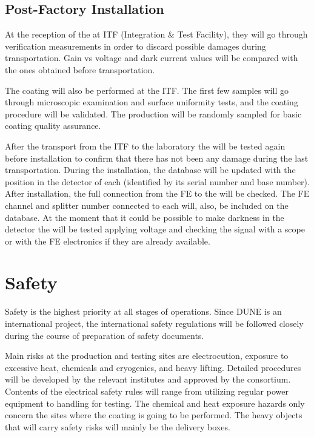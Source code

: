  \subsection{Post-Factory Installation}
 \label{sec:fddp-pd-10.2}
 
At the reception of the  at ITF (Integration \& Test Facility), they will go through verification measurements in order to discard possible damages during transportation. Gain vs voltage and dark current values will be compared with the ones obtained before transportation.

The  coating will also be performed at the ITF. The first few samples will go through microscopic examination and surface uniformity tests, and the coating procedure will be validated. The production  will be randomly sampled for basic coating quality assurance.

After the transport from the ITF to the laboratory the  will be tested again before installation to confirm that there has not been any damage during the last transportation. During the installation, the  database will be updated with the position in the detector of each  (identified by its serial number and base number). After installation, the full connection from the FE to the  will be checked. The FE channel and splitter number connected to each  will, also, be included on the  database. At the moment that it could be possible to make darkness in the detector the  will be tested applying voltage and checking the signal with a scope or with the FE electronics if they are already available.

\section{Safety}
\label{sec:fddp-pd-11}

Safety is the highest priority at all stages of \dual {} operations. Since DUNE is an international project, the international safety regulations will be followed closely during the course of preparation of safety documents.

Main risks at the production and testing sites are electrocution, exposure to excessive heat, chemicals and cryogenics, and heavy lifting. Detailed procedures will be developed by the relevant institutes and approved by the \dual {} consortium. Contents of the electrical safety rules will range from utilizing regular power equipment to handling  for testing. The chemical and heat exposure hazards only concern the sites where the  coating is going to be performed. The heavy objects that will carry safety risks will mainly be the  delivery boxes.

